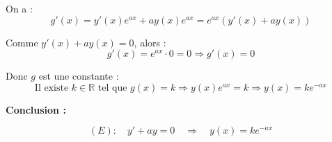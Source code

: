 \documentclass[12pt,a4paper]{article}
\begin{document}
On a :
\[
g'(x) = y'(x)e^{ax} + ay(x)e^{ax} = e^{ax} \left( y'(x) + ay(x) \right)
\]

Comme \( y'(x) + ay(x) = 0 \), alors :
\[
g'(x) = e^{ax} \cdot 0 = 0
\Rightarrow g'(x) = 0
\]

Donc \( g \) est une constante :
\[
\text{Il existe } k \in \mathbb{R} \text{ tel que } g(x) = k
\Rightarrow y(x)e^{ax} = k \Rightarrow y(x) = ke^{-ax}
\]

\vspace{0.5cm}

\textbf{Conclusion :}

\begin{tcolorbox}[colback=white, colframe=red, sharp corners=southwest, boxrule=1pt]
\[
\boxed{(E):\quad y' + ay = 0 \quad \Rightarrow \quad y(x) = ke^{-ax}}
\]
\end{tcolorbox}
\end{document}
